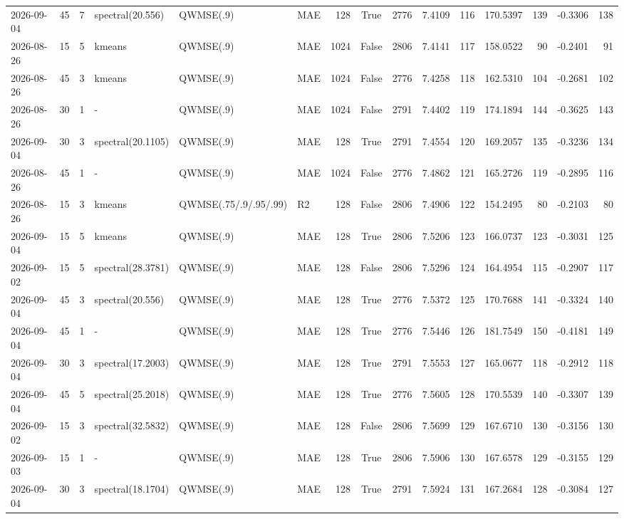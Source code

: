 \documentclass[10pt]{article}
\begin{document}
\begin{landscape}
\begin{longtable}{@{}lrrlllrcrrrrrrr@{}}
2026-09-04 & 45 & 7 & spectral(20.556) & QWMSE(.9) & MAE & 128 & True & 2776 & 7.4109 & 116 & 170.5397 & 139 & -0.3306 & 138 \\
2026-08-26 & 15 & 5 & kmeans & QWMSE(.9) & MAE & 1024 & False & 2806 & 7.4141 & 117 & 158.0522 & 90 & -0.2401 & 91 \\
2026-08-26 & 45 & 3 & kmeans & QWMSE(.9) & MAE & 1024 & False & 2776 & 7.4258 & 118 & 162.5310 & 104 & -0.2681 & 102 \\
2026-08-26 & 30 & 1 & - & QWMSE(.9) & MAE & 1024 & False & 2791 & 7.4402 & 119 & 174.1894 & 144 & -0.3625 & 143 \\
2026-09-04 & 30 & 3 & spectral(20.1105) & QWMSE(.9) & MAE & 128 & True & 2791 & 7.4554 & 120 & 169.2057 & 135 & -0.3236 & 134 \\
2026-08-26 & 45 & 1 & - & QWMSE(.9) & MAE & 1024 & False & 2776 & 7.4862 & 121 & 165.2726 & 119 & -0.2895 & 116 \\
2026-08-26 & 15 & 3 & kmeans & QWMSE(.75/.9/.95/.99) & R2 & 128 & False & 2806 & 7.4906 & 122 & 154.2495 & 80 & -0.2103 & 80 \\
2026-09-04 & 15 & 5 & kmeans & QWMSE(.9) & MAE & 128 & True & 2806 & 7.5206 & 123 & 166.0737 & 123 & -0.3031 & 125 \\
2026-09-02 & 15 & 5 & spectral(28.3781) & QWMSE(.9) & MAE & 128 & False & 2806 & 7.5296 & 124 & 164.4954 & 115 & -0.2907 & 117 \\
2026-09-04 & 45 & 3 & spectral(20.556) & QWMSE(.9) & MAE & 128 & True & 2776 & 7.5372 & 125 & 170.7688 & 141 & -0.3324 & 140 \\
2026-09-04 & 45 & 1 & - & QWMSE(.9) & MAE & 128 & True & 2776 & 7.5446 & 126 & 181.7549 & 150 & -0.4181 & 149 \\
2026-09-04 & 30 & 3 & spectral(17.2003) & QWMSE(.9) & MAE & 128 & True & 2791 & 7.5553 & 127 & 165.0677 & 118 & -0.2912 & 118 \\
2026-09-04 & 45 & 5 & spectral(25.2018) & QWMSE(.9) & MAE & 128 & True & 2776 & 7.5605 & 128 & 170.5539 & 140 & -0.3307 & 139 \\
2026-09-02 & 15 & 3 & spectral(32.5832) & QWMSE(.9) & MAE & 128 & False & 2806 & 7.5699 & 129 & 167.6710 & 130 & -0.3156 & 130 \\
2026-09-03 & 15 & 1 & - & QWMSE(.9) & MAE & 128 & True & 2806 & 7.5906 & 130 & 167.6578 & 129 & -0.3155 & 129 \\
2026-09-04 & 30 & 3 & spectral(18.1704) & QWMSE(.9) & MAE & 128 & True & 2791 & 7.5924 & 131 & 167.2684 & 128 & -0.3084 & 127 \\

\end{longtable}
\end{landscape}
\end{document}
